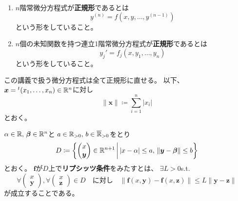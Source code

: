 \documentclass[report]{jlreq}
\begin{document}
\begin{definition}[1.2.1 正規形]
    \,
    \begin{enumerate}
        \item $n$階常微分方程式が\textbf{正規形}であるとは
            \begin{equation}
                y^{(n)} = f(x, y, \dots, y^{(n-1)})
            \end{equation}
            という形をしていること。
        \item $n$個の未知関数を持つ連立1階常微分方程式が\textbf{正規形}であるとは
            \begin{equation}
                y_j' = f_j(x, y_1, \dots, y_n)
            \end{equation}
            という形をしていること。
    \end{enumerate}
\end{definition}

この講義で扱う微分方程式は全て正規形に直せる。
以下、$\bm{x} = {}^t (x_1, \dots, x_n) \in \mathbb{R}^n$に対し
\begin{equation}
    \| \bm{x} \| \coloneqq \sum_{i=1}^n |x_i|
\end{equation}
とおく。

\begin{definition}[1.2.3 リプシッツ条件]
    $\alpha \in \mathbb{R},\, \bm{\beta} \in \mathbb{R}^n$と
    $a \in \mathbb{R}_{>0},\, b \in \overline{\mathbb{R}}_{>0}$をとり
    \begin{equation}
        D \coloneqq \left\{
            \begin{pmatrix}
                x \\
                \bm{y}
            \end{pmatrix} \in \mathbb{R}^{n+1}
            \,\middle|\,
            |x-\alpha| \le a,\, \|\bm{y} - \bm{\beta}\| \le b
        \right\}
    \end{equation}
    とおく。
    $\bm{f}$が$D$上で\textbf{リプシッツ条件}をみたすとは、
    $\exists L > 0$\quad s.t.
    \begin{equation}
        \forall
            \begin{pmatrix}
                x \\
                \bm{y}
            \end{pmatrix},
        \forall
            \begin{pmatrix}
                x \\
                \bm{z}
            \end{pmatrix}
            \in D
        \quad \text{に対し} \quad
        \| \bm{f}(x, \bm{y}) - \bm{f}(x, \bm{z}) \| \le L \| \bm{y} - \bm{z} \|
    \end{equation}
    が成立することである。
\end{definition}
\end{document}
